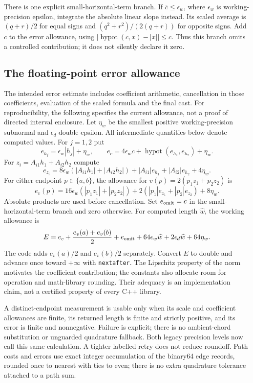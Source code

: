 \documentclass[11pt,letterpaper]{article}
\newcommand{\src}[1]{\nolinkurl{#1}}
\begin{document}
There is one explicit small-horizontal-term branch. If $\bar c\le\epsilon_w$,
where $\epsilon_w$ is working-precision epsilon, integrate the absolute
linear slope instead. Its scaled average is $(q+r)/2$ for equal signs and
$(q^2+r^2)/(2(q+r))$ for opposite signs. Add $c$ to the error allowance,
using $|\operatorname{hypot}(c,x)-|x||\le c$. Thus this branch omits a
controlled contribution; it does not silently declare it zero.

\subsection{The floating-point error allowance}
\label{sec:cpp-errors}

The intended error estimate includes coefficient arithmetic, cancellation
in those coefficients, evaluation of the scaled formula and the final cast.
For reproducibility, the following specifies the current allowance, not a
proof of directed interval enclosure. Let $\eta_w$ be the smallest positive
working-precision subnormal and $\epsilon_d$ double epsilon. All intermediate
quantities below denote computed values. For $j=1,2$ put
\[
 e_{h_j}=\epsilon_w|h_j|+\eta_w,\qquad
 e_c=4\epsilon_wc+\operatorname{hypot}(e_{h_1},e_{h_2})+\eta_w.
\]
For $z_i=A_{i1}h_1+A_{i2}h_2$ compute
\[
 e_{z_i}=8\epsilon_w(|A_{i1}h_1|+|A_{i2}h_2|)
       +|A_{i1}|e_{h_1}+|A_{i2}|e_{h_2}+4\eta_w.
\]
For either endpoint $p\in\{a,b\}$, the allowance for $v(p)=2(p_1z_1+p_2z_2)$ is
\[
 e_v(p)=16\epsilon_w(|p_1z_1|+|p_2z_2|)
       +2(|p_1|e_{z_1}+|p_2|e_{z_2})+8\eta_w.
\]
Absolute products are used before cancellation. Set $e_{\rm omit}=c$ in
the small-horizontal-term branch and zero otherwise. For computed length
$\widehat w$, the working allowance is
\begin{equation}\label{eq:cpp-error}
 E=e_c+\frac{e_v(a)+e_v(b)}2+e_{\rm omit}
      +64\epsilon_w\widehat w+2\epsilon_d\widehat w+64\eta_w.
\end{equation}
The code adds $e_v(a)/2$ and $e_v(b)/2$ separately. Convert $E$ to double
and advance once toward $+\infty$ with \src{nextafter}. The Lipschitz
property of the norm motivates the coefficient contribution; the constants
also allocate room for operation and math-library rounding. Their adequacy
is an implementation claim, not a certified property of every C++ library.

A distinct-endpoint measurement is usable only when its scale and coefficient
allowances are finite, its returned length is finite and strictly positive,
and its error is finite and nonnegative. Failure is explicit; there is no
ambient-chord substitution or unguarded quadrature fallback. Both legacy
precision levels now call this same calculation. A tighter-labelled retry
does not reduce roundoff. Path costs and errors use exact integer accumulation
of the binary64 edge records, rounded once to nearest with ties to even;
there is no extra quadrature tolerance attached
to a path sum.
\end{document}
